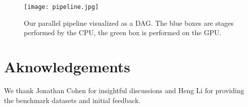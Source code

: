 \documentclass{acmsiggraph}
\begin{document}
\begin{figure}
\begin{center}
 \texttt{[image: pipeline.jpg]}
 \caption{Our parallel pipeline visualized as a DAG. The blue boxes are stages performed by the CPU, the green box is performed on the GPU.}
\end{center}
\end{figure}

\section{Aknowledgements}

We thank Jonathan Cohen for insightful discussions and Heng Li for providing the benchmark datasets and initial feedback.



\end{document}
